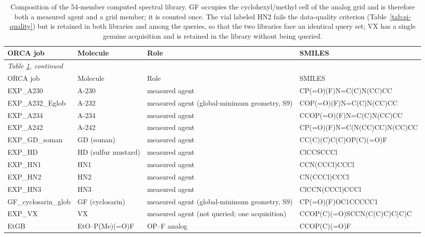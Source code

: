 \documentclass[11pt]{article}
\begin{document}
{\scriptsize
\begin{longtable}{p{2.9cm} >{\raggedright\arraybackslash}p{2.8cm} >{\raggedright\arraybackslash}p{3.7cm} >{\ttfamily\raggedright\arraybackslash}p{4.4cm}}
\caption{Composition of the 54-member computed spectral library. GF occupies the cyclohexyl/methyl cell of the analog grid and is therefore both a measured agent and a grid member; it is counted once. The vial labeled HN2 fails the data-quality criterion (Table~\ref{tab:si-quality}) but is retained in both libraries and among the queries, so that the two libraries face an identical query set; VX has a single genuine acquisition and is retained in the library without being queried.}\label{tab:si-library}\\
\toprule
ORCA job & Molecule & Role & SMILES \\
\midrule
\endfirsthead
\multicolumn{4}{l}{\footnotesize\emph{Table \ref{tab:si-library}, continued}}\\
\toprule
ORCA job & Molecule & Role & SMILES \\
\midrule
\endhead
\bottomrule
\endfoot
EXP\_A230 & A-230 & measured agent & {CP(=O)(F)N=C(C)N(CC)CC} \\
EXP\_A232\_Eglob & A-232 & measured agent (global-minimum geometry, S9) & {COP(=O)(F)N=C(C)N(CC)CC} \\
EXP\_A234 & A-234 & measured agent & {CCOP(=O)(F)N=C(C)N(CC)CC} \\
EXP\_A242 & A-242 & measured agent & {CP(=O)(F)N=C(N(CC)CC)N(CC)CC} \\
EXP\_GD\_soman & GD (soman) & measured agent & {CC(C)(C)C(C)OP(C)(=O)F} \\
EXP\_HD & HD (sulfur mustard) & measured agent & {ClCCSCCCl} \\
EXP\_HN1 & HN1 & measured agent & {CCN(CCCl)CCCl} \\
EXP\_HN2 & HN2 & measured agent & {CN(CCCl)CCCl} \\
EXP\_HN3 & HN3 & measured agent & {ClCCN(CCCl)CCCl} \\
GF\_cyclosarin\_glob & GF (cyclosarin) & measured agent (global-minimum geometry, S9) & {CP(=O)(F)OC1CCCCC1} \\
EXP\_VX & VX & measured agent (not queried; one acquisition) & {CCOP(C)(=O)SCCN(C(C)C)C(C)C} \\
EtGB & EtO--P(Me)(=O)F & OP--F analog & {CCOP(C)(=O)F} \\

\end{longtable}}
\end{document}

